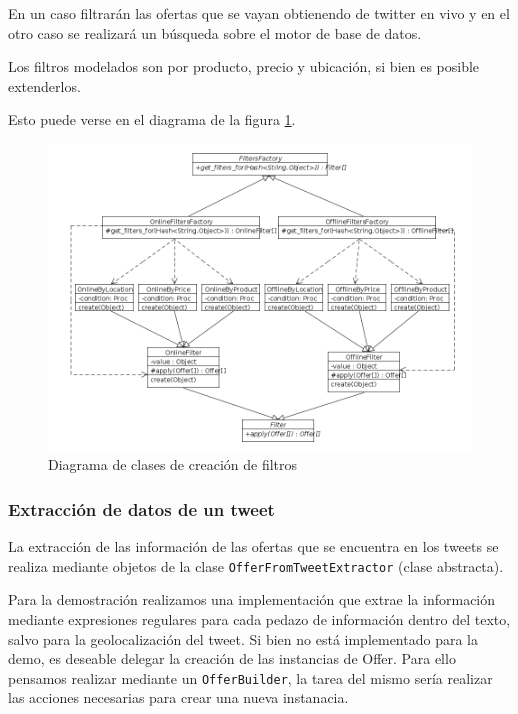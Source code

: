 En un caso filtrar\'an las ofertas que se vayan obtienendo de twitter en vivo y en el otro caso se realizar\'a un b\'usqueda sobre el motor de base de datos.

Los filtros modelados son por producto, precio y ubicaci\'on, si bien es posible extenderlos.

Esto puede verse en el diagrama de la figura \ref{fig:class_filter_factory}. 

\begin{figure}[h]
\centerline{\includegraphics[width=0.6\paperwidth]{./imgs/class_diagram_filters_factory.png}}
\caption{Diagrama de clases de creaci\'on de filtros}
\label{fig:class_filter_factory} 
\end{figure}

\subsubsection{Extracci\'on de datos de un tweet}
La extracci\'on de las informaci\'on de las ofertas que se encuentra en los tweets se realiza mediante objetos de la clase \texttt{OfferFromTweetExtractor} (clase abstracta).

Para la demostraci\'on realizamos una implementaci\'on que extrae la informaci\'on mediante expresiones regulares para cada pedazo de informaci\'on dentro del texto, salvo para la geolocalizaci\'on del tweet.
Si bien no est\'a implementado para la demo, es deseable delegar la creaci\'on de las instancias de Offer. Para ello pensamos realizar mediante un \texttt{OfferBuilder}, la tarea del mismo ser\'ia realizar las acciones necesarias para crear una nueva instanacia.

